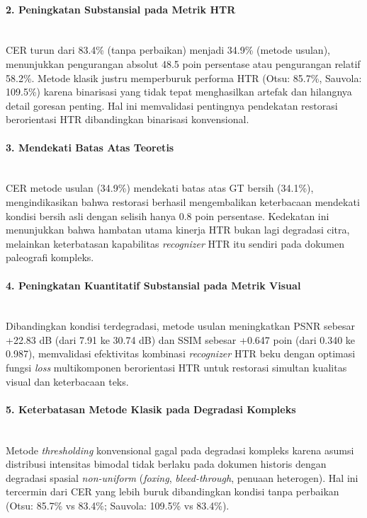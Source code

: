 \documentclass[12pt,a4paper]{article}
\begin{document}
\paragraph{2. Peningkatan Substansial pada Metrik HTR} \mbox{}\\[0.1em] 
CER turun dari 83.4\% (tanpa perbaikan) menjadi 34.9\% (metode usulan), menunjukkan pengurangan absolut 48.5 poin persentase atau pengurangan relatif 58.2\%. Metode klasik justru memperburuk performa HTR (Otsu: 85.7\%, Sauvola: 109.5\%) karena binarisasi yang tidak tepat menghasilkan artefak dan hilangnya detail goresan penting. Hal ini memvalidasi pentingnya pendekatan restorasi berorientasi HTR dibandingkan binarisasi konvensional.

\paragraph{3. Mendekati Batas Atas Teoretis} \mbox{}\\[0.1em]
CER metode usulan (34.9\%) mendekati batas atas GT bersih (34.1\%), mengindikasikan bahwa restorasi berhasil mengembalikan keterbacaan mendekati kondisi bersih asli dengan selisih hanya 0.8 poin persentase. Kedekatan ini menunjukkan bahwa hambatan utama kinerja HTR bukan lagi degradasi citra, melainkan keterbatasan kapabilitas \textit{recognizer} HTR itu sendiri pada dokumen paleografi kompleks.

\paragraph{4.  Peningkatan Kuantitatif Substansial pada Metrik Visual} \mbox{}\\[0.1em]
Dibandingkan kondisi terdegradasi, metode usulan meningkatkan PSNR sebesar +22.83 dB (dari 7.91 ke 30.74 dB) dan SSIM sebesar +0.647 poin (dari 0.340 ke 0.987), memvalidasi efektivitas kombinasi \textit{recognizer} HTR beku dengan optimasi fungsi \textit{loss} multikomponen berorientasi HTR untuk restorasi simultan kualitas visual dan keterbacaan teks.

\paragraph{5.  Keterbatasan Metode Klasik pada Degradasi Kompleks} \mbox{}\\[0.1em]
Metode \textit{thresholding} konvensional gagal pada degradasi kompleks karena asumsi distribusi intensitas bimodal tidak berlaku pada dokumen historis dengan degradasi spasial \textit{non-uniform} (\textit{foxing}, \textit{bleed-through}, penuaan heterogen). Hal ini tercermin dari CER yang lebih buruk dibandingkan kondisi tanpa perbaikan (Otsu: 85.7\% vs 83.4\%; Sauvola: 109.5\% vs 83.4\%).
\end{document}
